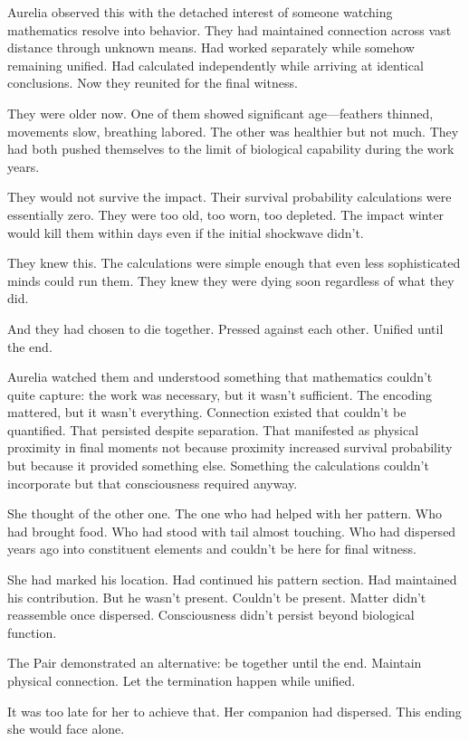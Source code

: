 Aurelia observed this with the detached interest of someone watching mathematics resolve into behavior. They had maintained connection across vast distance through unknown means. Had worked separately while somehow remaining unified. Had calculated independently while arriving at identical conclusions. Now they reunited for the final witness.

They were older now. One of them showed significant age—feathers thinned, movements slow, breathing labored. The other was healthier but not much. They had both pushed themselves to the limit of biological capability during the work years.

They would not survive the impact. Their survival probability calculations were essentially zero. They were too old, too worn, too depleted. The impact winter would kill them within days even if the initial shockwave didn't.

They knew this. The calculations were simple enough that even less sophisticated minds could run them. They knew they were dying soon regardless of what they did.

And they had chosen to die together. Pressed against each other. Unified until the end.

Aurelia watched them and understood something that mathematics couldn't quite capture: the work was necessary, but it wasn't sufficient. The encoding mattered, but it wasn't everything. Connection existed that couldn't be quantified. That persisted despite separation. That manifested as physical proximity in final moments not because proximity increased survival probability but because it provided something else. Something the calculations couldn't incorporate but that consciousness required anyway.

She thought of the other one. The one who had helped with her pattern. Who had brought food. Who had stood with tail almost touching. Who had dispersed years ago into constituent elements and couldn't be here for final witness.

She had marked his location. Had continued his pattern section. Had maintained his contribution. But he wasn't present. Couldn't be present. Matter didn't reassemble once dispersed. Consciousness didn't persist beyond biological function.

The Pair demonstrated an alternative: be together until the end. Maintain physical connection. Let the termination happen while unified.

It was too late for her to achieve that. Her companion had dispersed. This ending she would face alone.

